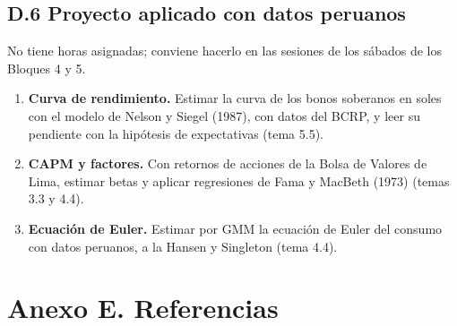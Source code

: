 \documentclass[11pt,a4paper]{article}
\begin{document}
\subsection*{D.6 Proyecto aplicado con datos peruanos}
No tiene horas asignadas; conviene hacerlo en las sesiones de los sábados de
los Bloques 4 y 5.
\begin{enumerate}[leftmargin=1.6em,itemsep=2pt]
  \item \textbf{Curva de rendimiento.} Estimar la curva de los bonos soberanos en
        soles con el modelo de Nelson y Siegel (1987), con datos del BCRP, y
        leer su pendiente con la hipótesis de expectativas (tema 5.5).
  \item \textbf{CAPM y factores.} Con retornos de acciones de la Bolsa de
        Valores de Lima, estimar betas y aplicar regresiones de Fama y MacBeth
        (1973) (temas 3.3 y 4.4).
  \item \textbf{Ecuación de Euler.} Estimar por GMM la ecuación de Euler del
        consumo con datos peruanos, a la Hansen y Singleton (tema 4.4).
\end{enumerate}

\section*{Anexo E. Referencias}
\end{document}
